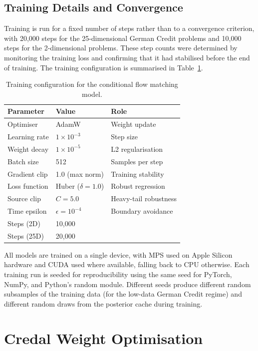 \subsection{Training Details and 
Convergence}

Training is run for a fixed number of 
steps rather than to a convergence 
criterion, with 20,000 steps for the 
25-dimensional German Credit problems 
and 10,000 steps for the 2-dimensional 
problems. These step counts were 
determined by monitoring the training 
loss and confirming that it had 
stabilised before the end of training. 
The training configuration is 
summarised in Table~\ref{tab:train_config}.

\begin{table}[h]
\centering
\caption{Training configuration for 
the conditional flow matching model.}
\label{tab:train_config}
{\singlespacing
\begin{tabular}{lll}
\hline
Parameter & Value & Role \\
\hline
Optimiser & AdamW & Weight update \\
Learning rate & $1 \times 10^{-3}$ 
& Step size \\
Weight decay & $1 \times 10^{-5}$ 
& L2 regularisation \\
Batch size & 512 & Samples per step \\
Gradient clip & 1.0 (max norm) 
& Training stability \\
Loss function & Huber ($\delta=1.0$) 
& Robust regression \\
Source clip & $C = 5.0$ 
& Heavy-tail robustness \\
Time epsilon & $\epsilon = 10^{-4}$ 
& Boundary avoidance \\
Steps (2D) & 10{,}000 & \\
Steps (25D) & 20{,}000 & \\
\hline
\end{tabular}}
\end{table}

All models are trained on a single 
device, with MPS used on Apple Silicon 
hardware and CUDA used where available, 
falling back to CPU otherwise. Each 
training run is seeded for reproducibility 
using the same seed for PyTorch, NumPy, 
and Python's random module. Different 
seeds produce different random subsamples 
of the training data (for the low-data 
German Credit regime) and different 
random draws from the posterior cache 
during training.

\section{Credal Weight Optimisation}


